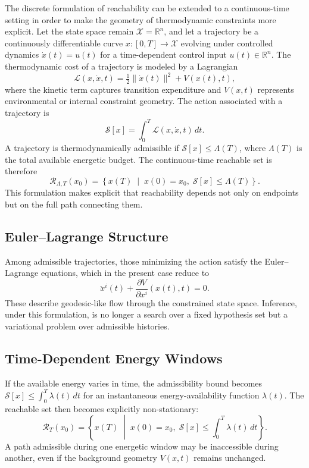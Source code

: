\documentclass[12pt]{article}
\theoremstyle{plain}
\theoremstyle{definition}
\theoremstyle{remark}
\begin{document}
The discrete formulation of reachability can be extended to a continuous-time setting in order to make the geometry of thermodynamic constraints more explicit. Let the state space remain $\mathcal{X} = \mathbb{R}^n$, and let a trajectory be a continuously differentiable curve $x : [0,T] \to \mathcal{X}$ evolving under controlled dynamics $\dot{x}(t) = u(t)$ for a time-dependent control input $u(t) \in \mathbb{R}^n$. The thermodynamic cost of a trajectory is modeled by a Lagrangian
\[
\mathcal{L}(x,\dot{x},t) = \tfrac{1}{2}\|\dot{x}(t)\|^2 + V(x(t),t),
\]
where the kinetic term captures transition expenditure and $V(x,t)$ represents environmental or internal constraint geometry. The action associated with a trajectory is
\[
\mathcal{S}[x] = \int_0^T \mathcal{L}(x,\dot{x},t)\,dt.
\]
A trajectory is thermodynamically admissible if $\mathcal{S}[x] \leq \Lambda(T)$, where $\Lambda(T)$ is the total available energetic budget. The continuous-time reachable set is therefore
\[
\mathcal{R}_{\Lambda,T}(x_0) = \left\{ x(T) \;\middle|\; x(0)=x_0,\; \mathcal{S}[x]\leq \Lambda(T) \right\}.
\]
This formulation makes explicit that reachability depends not only on endpoints but on the full path connecting them.

\subsection{Euler--Lagrange Structure}

Among admissible trajectories, those minimizing the action satisfy the Euler--Lagrange equations, which in the present case reduce to
\[
\ddot{x}^i(t) + \frac{\partial V}{\partial x^i}(x(t),t) = 0.
\]
These describe geodesic-like flow through the constrained state space. Inference, under this formulation, is no longer a search over a fixed hypothesis set but a variational problem over admissible histories.

\subsection{Time-Dependent Energy Windows}

If the available energy varies in time, the admissibility bound becomes $\mathcal{S}[x] \leq \int_0^T \lambda(t)\,dt$ for an instantaneous energy-availability function $\lambda(t)$. The reachable set then becomes explicitly non-stationary:
\[
\mathcal{R}_{T}(x_0) = \left\{ x(T) \;\middle|\; x(0)=x_0,\; \mathcal{S}[x]\leq \int_0^T \lambda(t)\,dt \right\}.
\]
A path admissible during one energetic window may be inaccessible during another, even if the background geometry $V(x,t)$ remains unchanged.
\end{document}
